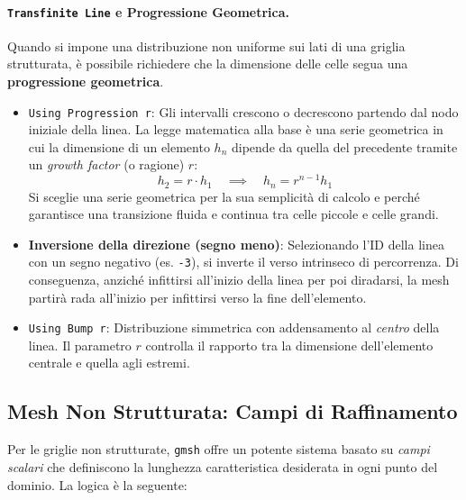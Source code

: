 \paragraph{\texttt{Transfinite Line} e Progressione Geometrica.}
Quando si impone una distribuzione non uniforme sui lati di una griglia strutturata, è possibile richiedere che la dimensione delle celle segua una \textbf{progressione geometrica}.
\begin{itemize}
  \item \texttt{Using Progression r}: Gli intervalli crescono o decrescono partendo dal nodo iniziale della linea. La legge matematica alla base è una serie geometrica in cui la dimensione di un elemento $h_n$ dipende da quella del precedente tramite un \emph{growth factor} (o ragione) $r$:
  \begin{equation*}
      h_2 = r \cdot h_1 \quad \implies \quad h_n = r^{n-1} h_1
  \end{equation*}
  Si sceglie una serie geometrica per la sua semplicità di calcolo e perché garantisce una transizione fluida e continua tra celle piccole e celle grandi.
  \item \textbf{Inversione della direzione (segno meno)}: Selezionando l'ID della linea con un segno negativo (es. \texttt{-3}), si inverte il verso intrinseco di percorrenza. Di conseguenza, anziché infittirsi all'inizio della linea per poi diradarsi, la mesh partirà rada all'inizio per infittirsi verso la fine dell'elemento.
  \item \texttt{Using Bump r}: Distribuzione simmetrica con addensamento al \emph{centro} della linea. Il parametro $r$ controlla il rapporto tra la dimensione dell'elemento centrale e quella agli estremi.
\end{itemize}

\subsection{Mesh Non Strutturata: Campi di Raffinamento}
\label{sec:campi}

Per le griglie non strutturate, \texttt{gmsh} offre un potente sistema basato su \emph{campi
scalari} che definiscono la lunghezza caratteristica desiderata in ogni punto del dominio.
La logica è la seguente:

